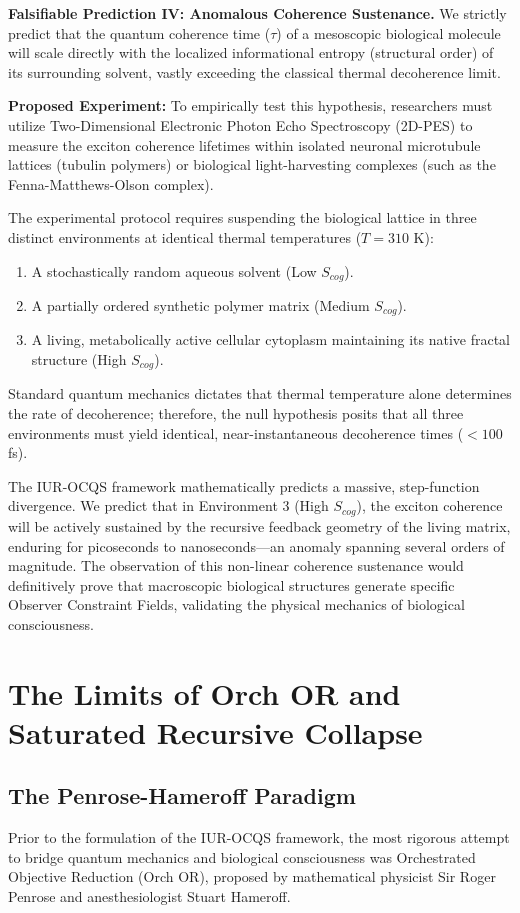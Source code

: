 \documentclass[12pt,openany]{book}
\begin{document}
\textbf{Falsifiable Prediction IV: Anomalous Coherence Sustenance.} We strictly predict that the quantum coherence time ($\tau$) of a mesoscopic biological molecule will scale directly with the localized informational entropy (structural order) of its surrounding solvent, vastly exceeding the classical thermal decoherence limit.

\textbf{Proposed Experiment:} To empirically test this hypothesis, researchers must utilize Two-Dimensional Electronic Photon Echo Spectroscopy (2D-PES) to measure the exciton coherence lifetimes within isolated neuronal microtubule lattices (tubulin polymers) or biological light-harvesting complexes (such as the Fenna-Matthews-Olson complex). 

The experimental protocol requires suspending the biological lattice in three distinct environments at identical thermal temperatures ($T = 310$ K):
\begin{enumerate}
    \item A stochastically random aqueous solvent (Low $S_{cog}$).
    \item A partially ordered synthetic polymer matrix (Medium $S_{cog}$).
    \item A living, metabolically active cellular cytoplasm maintaining its native fractal structure (High $S_{cog}$).
\end{enumerate}

Standard quantum mechanics dictates that thermal temperature alone determines the rate of decoherence; therefore, the null hypothesis posits that all three environments must yield identical, near-instantaneous decoherence times ($< 100$ fs). 

The IUR-OCQS framework mathematically predicts a massive, step-function divergence. We predict that in Environment 3 (High $S_{cog}$), the exciton coherence will be actively sustained by the recursive feedback geometry of the living matrix, enduring for picoseconds to nanoseconds---an anomaly spanning several orders of magnitude. The observation of this non-linear coherence sustenance would definitively prove that macroscopic biological structures generate specific Observer Constraint Fields, validating the physical mechanics of biological consciousness.

\chapter{The Limits of Orch OR and Saturated Recursive Collapse}

\section{The Penrose-Hameroff Paradigm}
Prior to the formulation of the IUR-OCQS framework, the most rigorous attempt to bridge quantum mechanics and biological consciousness was Orchestrated Objective Reduction (Orch OR), proposed by mathematical physicist Sir Roger Penrose and anesthesiologist Stuart Hameroff. 
\end{document}
